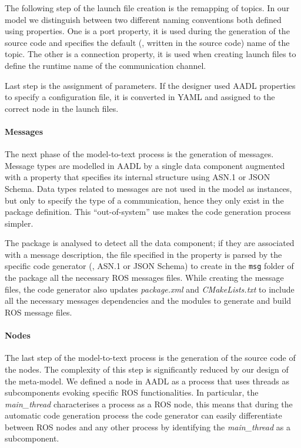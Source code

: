 The following step of the launch file creation is the remapping of topics. In our model we distinguish between two different naming conventions both defined using properties. One is a port property, it is used during the generation of the source code and specifies the default (\ie, written in the source code) name of the topic. The other is a connection property, it is used when creating launch files to define the runtime name of the communication channel.

Last step is the assignment of parameters. If the designer used AADL properties to specify a configuration file, it is converted in YAML and assigned to the correct node in the launch files.
  
\paragraph{Messages} The next phase of the model-to-text process is the generation of messages. Message types are modelled in AADL by a single data component augmented with a property that specifies its internal structure using ASN.1 or JSON Schema. Data types related to messages are not used in the model as instances, but only to specify the type of a communication, hence they only exist in the package definition. This ``out-of-system'' use makes the code generation process simpler.

The package is analysed to detect all the data component; if they are associated with a message description, the file specified in the property is parsed by the specific code generator (\ie, ASN.1 or JSON Schema) to create in the \texttt{msg} folder of the package all the necessary ROS messages files. While creating the message files, the code generator also updates \textit{package.xml} and \textit{CMakeLists.txt} to include all the necessary messages dependencies and the modules to generate and build ROS message files.

\paragraph{Nodes} The last step of the model-to-text process is the generation of the source code of the nodes. The complexity of this step is significantly reduced by our design of the meta-model. We defined a node in AADL as a process that uses threads as subcomponents evoking specific ROS functionalities. In particular, the \textit{main\_thread} characterises a process as a ROS node, this means that during the automatic code generation process the code generator can easily differentiate between ROS nodes and any other process by identifying the \textit{main\_thread} as a subcomponent.

